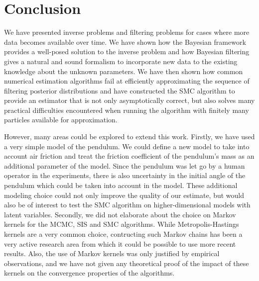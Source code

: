 \section{Conclusion}

We have presented inverse problems and filtering problems for cases where more data becomes available over time. We have shown how the Bayesian framework provides a well-posed solution to the inverse problem and how Bayesian filtering gives a natural and sound formalism to incorporate new data to the existing knowledge about the unknown parameters. We have then shown how common numerical estimation algorithms fail at efficiently approximating the sequence of filtering posterior distributions and have constructed the SMC algorithm to provide an estimator that is not only asymptotically correct, but also solves many practical difficulties encountered when running the algorithm with finitely many particles available for approximation.

However, many areas could be explored to extend this work. Firstly, we have used a very simple model of the pendulum. We could define a new model to take into account air friction and treat the friction coefficient of the pendulum's mass as an additional parameter of the model. Since the pendulum was let go by a human operator in the experiments, there is also uncertainty in the initial angle of the pendulum which could be taken into account in the model. These additional modeling choice could not only improve the quality of our estimate, but would also be of interest to test the SMC algorithm on higher-dimensional models with latent variables. Secondly, we did not elaborate about the choice on Markov kernels for the MCMC, SIS and SMC algorithms. While Metropolis-Hastings kernels are a very common choice, contructing such Markov chains has been a very active research area from which it could be possible to use more recent results. Also, the use of Markov kernels was only justified by empirical observations, and we have not given any theoretical proof of the impact of these kernels on the convergence properties of the algorithms.

